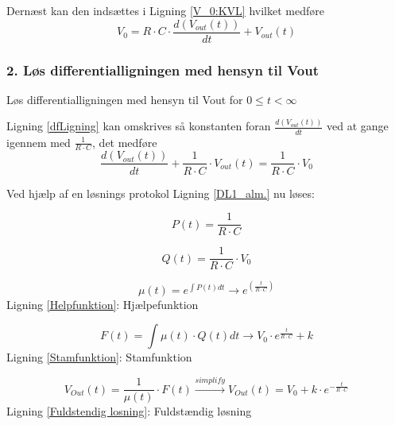 Dernæst kan den indsættes i Ligning \ref{V_0:KVL} hvilket medføre 
\begin{equation}
 V_{0}= R \cdot C \cdot \frac{d(V_{out}(t))}{dt} + V_{out}(t)
\end{equation}
	
\subsubsection*{2. Løs differentialligningen med hensyn til Vout }
 Løs differentialligningen med hensyn til Vout for $ 0\leq t<\infty$
 
 Ligning \ref{dfLigning} kan omskrives så konstanten foran $\frac{d(V_{out}(t))}{dt}$ ved at gange igennem med $\frac{1}{R \cdot C}$, det medføre 
\begin{equation}
\frac{d(V_{out}(t))}{dt}+\frac{1}{R \cdot C}\cdot V_{out}(t) =\frac{1}{R \cdot C} \cdot V_{0}
\label{DL1_alm.}
\end{equation} 

Ved hjælp af en løsnings protokol Ligning \ref{DL1_alm.} nu løses:

\begin{equation}
P(t) = \frac{1}{R \cdot C}
\end{equation}

\begin{equation}
Q(t) = \frac{1}{R \cdot C}\cdot V_{0}
\end{equation}

\begin{center}
\begin{equation}
\mu(t) = e^{\int{P(t) dt}}\rightarrow e^{(\frac{t}{R \cdot C})}
\label{Helpfunktion}
\end{equation}
Ligning \ref{Helpfunktion}: Hjælpefunktion
\end{center}

\begin{center}
\begin{equation}
F(t)=\int{\mu(t) \cdot Q(t) dt}\rightarrow V_{0} \cdot e^{\frac{t}{R \cdot C}}+k
\label{Stamfunktion}
\end{equation}
Ligning \ref{Stamfunktion}: Stamfunktion
\end{center}

\begin{center}
\begin{equation}
V_{Out}(t) = \frac{1}{\mu(t)} \cdot F(t) \xrightarrow[ ]{simplify} V_{Out}(t) = V_{0}+k \cdot e^{-\frac{t}{R \cdot C}}
\label{Fuldstendig losning}
\end{equation}
Ligning \ref{Fuldstendig losning}: Fuldstændig løsning
\end{center}

